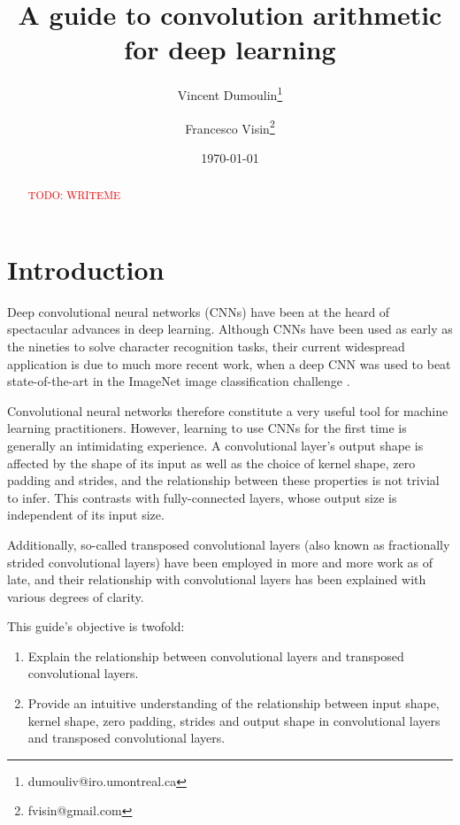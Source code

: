 \documentclass{article}
\title{A guide to convolution arithmetic for deep learning}
\author[1]{Vincent Dumoulin\thanks{dumouliv@iro.umontreal.ca}}
\author[1]{Francesco Visin\thanks{fvisin@gmail.com}}
\affil[1]{MILA, Universit\'{e} de Montr\'{e}al}
\date{\today}
\newcommand{\todo}[1]{\textcolor{red}{TODO: #1}}
\begin{document}
\maketitle

\begin{abstract}
\todo{WRITEME}
\end{abstract}

\section{Introduction}

Deep convolutional neural networks (CNNs) have been at the heard of spectacular
advances in deep learning. Although CNNs have been used as early as the nineties
\citep{lecun1998gradient} to solve character recognition tasks, their current
widespread application is due to much more recent work, when a deep CNN was used
to beat state-of-the-art in the ImageNet image classification challenge
\citep{krizhevsky2012imagenet}.

Convolutional neural networks therefore constitute a very useful tool for
machine learning practitioners. However, learning to use CNNs for the first time
is generally an intimidating experience. A convolutional layer's output shape is
affected by the shape of its input as well as the choice of kernel shape, zero
padding and strides, and the relationship between these properties is not
trivial to infer. This contrasts with fully-connected layers, whose output size
is independent of its input size.

Additionally, so-called transposed convolutional layers (also known as
fractionally strided convolutional layers) have been employed in more and more
work as of late, and their relationship with convolutional layers has been
explained with various degrees of clarity.

This guide's objective is twofold:

\begin{enumerate}
    \item Explain the relationship between convolutional layers and transposed
        convolutional layers.
    \item Provide an intuitive understanding of the relationship between input
        shape, kernel shape, zero padding, strides and output shape in
        convolutional layers and transposed convolutional layers.
\end{enumerate}



\end{document}
